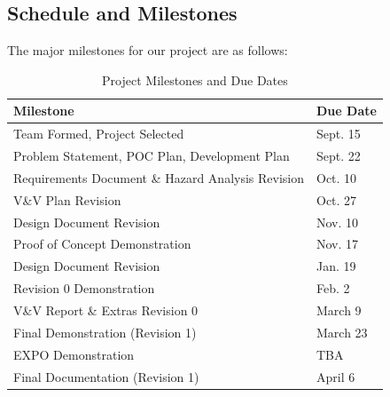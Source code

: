\documentclass{article}
\begin{document}
\subsection{Schedule and Milestones}\label{subsec:schedule}
\medskip
The major milestones for our project are as follows:
\begin{table}[htbp]
  \centering
  \begin{tabular}{|l|l|}
  \hline
  \textbf{Milestone} & \textbf{Due Date} \\ \hline
  Team Formed, Project Selected & Sept. 15 \\ \hline
  Problem Statement, POC Plan, Development Plan & Sept. 22 \\ \hline
  Requirements Document \& Hazard Analysis Revision & Oct. 10 \\ \hline
  V\&V Plan Revision & Oct. 27 \\ \hline
  Design Document Revision & Nov. 10 \\ \hline
  Proof of Concept Demonstration & Nov. 17 \\ \hline
  Design Document Revision & Jan. 19 \\ \hline
  Revision 0 Demonstration & Feb. 2 \\ \hline
  V\&V Report \& Extras Revision 0 & March 9 \\ \hline
  Final Demonstration (Revision 1) & March 23 \\ \hline
  EXPO Demonstration & TBA \\ \hline
  Final Documentation (Revision 1) & April 6 \\ \hline
  
  \end{tabular}
  \caption{Project Milestones and Due Dates}
  \label{tab:project-milestones}
  \end{table}

\FloatBarrier
\end{document}
